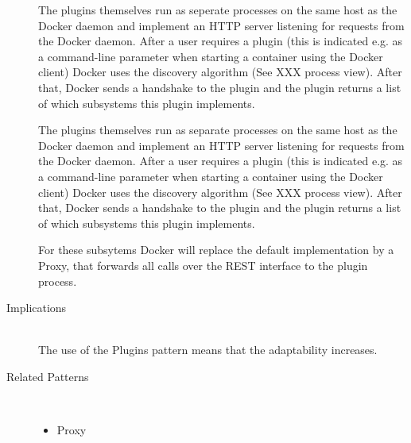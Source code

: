 \begin{description}
The plugins themselves run as seperate processes on the same host as the Docker daemon and implement an HTTP server listening for requests from the Docker daemon. After a user requires a plugin (this is indicated e.g. as a command-line parameter when starting a container using the Docker client) Docker uses the discovery algorithm (See XXX process view). After that, Docker sends a handshake to the plugin and the plugin returns a list of which subsystems this plugin implements.  %


The plugins themselves run as separate processes on the same host as the Docker daemon and implement an HTTP server listening for requests from the Docker daemon. After a user requires a plugin (this is indicated e.g. as a command-line parameter when starting a container using the Docker client) Docker uses the discovery algorithm (See XXX process view). After that, Docker sends a handshake to the plugin and the plugin returns a list of which subsystems this plugin implements.


For these subsytems Docker will replace the default implementation by a Proxy, that forwards all calls over the REST interface to the plugin process.

\item [Implications]~\\
The use of the Plugins pattern means that the adaptability increases. 

\item [Related Patterns]~
\begin{itemize}
\item Proxy
\end{itemize}

\end{description}

